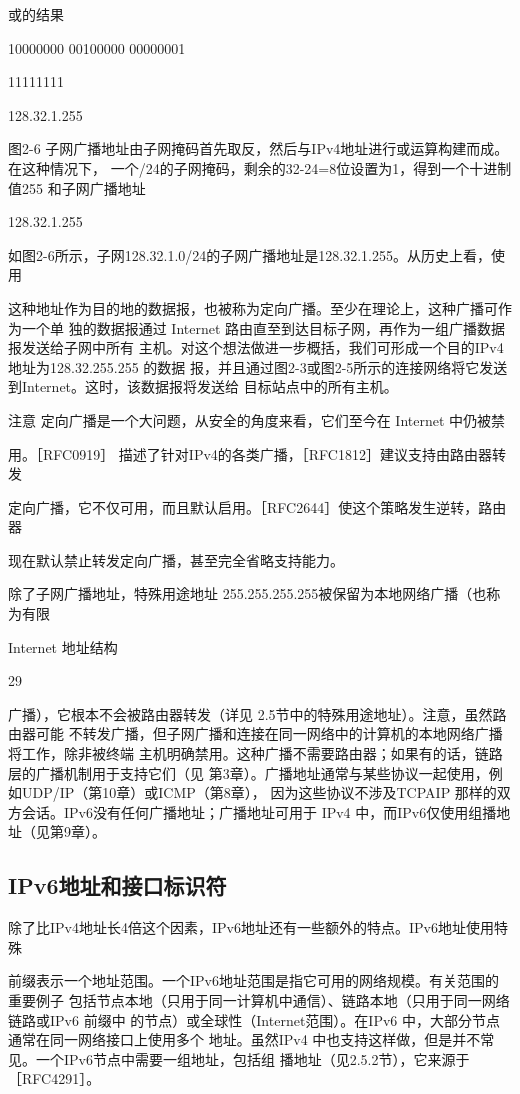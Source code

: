 或的结果

10000000 00100000 00000001

11111111

128.32.1.255

图2-6 子网广播地址由子网掩码首先取反，然后与IPv4地址进行或运算构建而成。在这种情况下，
一个/24的子网掩码，剩余的32-24=8位设置为1，得到一个十进制值255 和子网广播地址

128.32.1.255

如图2-6所示，子网128.32.1.0/24的子网广播地址是128.32.1.255。从历史上看，使用

这种地址作为目的地的数据报，也被称为定向广播。至少在理论上，这种广播可作为一个单
独的数据报通过 Internet 路由直至到达目标子网，再作为一组广播数据报发送给子网中所有
主机。对这个想法做进一步概括，我们可形成一个目的IPv4 地址为128.32.255.255 的数据
报，并且通过图2-3或图2-5所示的连接网络将它发送到Internet。这时，该数据报将发送给
目标站点中的所有主机。

注意 定向广播是一个大问题，从安全的角度来看，它们至今在 Internet 中仍被禁

用。［RFC0919］ 描述了针对IPv4的各类广播，［RFC1812］建议支持由路由器转发

定向广播，它不仅可用，而且默认启用。［RFC2644］使这个策略发生逆转，路由器

现在默认禁止转发定向广播，甚至完全省略支持能力。

除了子网广播地址，特殊用途地址 255.255.255.255被保留为本地网络广播（也称为有限

Internet 地址结构

29

广播），它根本不会被路由器转发（详见 2.5节中的特殊用途地址）。注意，虽然路由器可能
不转发广播，但子网广播和连接在同一网络中的计算机的本地网络广播将工作，除非被终端
主机明确禁用。这种广播不需要路由器；如果有的话，链路层的广播机制用于支持它们（见
第3章）。广播地址通常与某些协议一起使用，例如UDP/IP（第10章）或ICMP（第8章），
因为这些协议不涉及TCPAIP 那样的双方会话。IPv6没有任何广播地址；广播地址可用于
IPv4 中，而IPv6仅使用组播地址（见第9章）。

\subsection{IPv6地址和接口标识符}
除了比IPv4地址长4倍这个因素，IPv6地址还有一些额外的特点。IPv6地址使用特殊

前缀表示一个地址范围。一个IPv6地址范围是指它可用的网络规模。有关范围的重要例子
包括节点本地（只用于同一计算机中通信）、链路本地（只用于同一网络链路或IPv6 前缀中
的节点）或全球性（Internet范围）。在IPv6 中，大部分节点通常在同一网络接口上使用多个
地址。虽然IPv4 中也支持这样做，但是并不常见。一个IPv6节点中需要一组地址，包括组
播地址（见2.5.2节），它来源于［RFC4291］。


